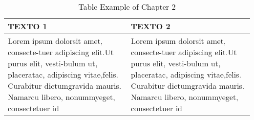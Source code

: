 %

\begin{table}[H]
    \begin{center}
        \begin{tabular}{|p{4cm}|p{4cm}|}
            \hline
            TEXTO 1  & TEXTO 2 \\
            \hline
            Lorem ipsum dolorsit amet, consecte-tuer adipiscing elit.Ut purus elit, vesti-bulum ut, placeratac, adipiscing vitae,felis. Curabitur dictumgravida mauris. Namarcu libero, nonummyeget, consectetuer id  & Lorem ipsum dolorsit amet, consecte-tuer adipiscing elit.Ut purus elit, vesti-bulum ut, placeratac, adipiscing vitae,felis. Curabitur dictumgravida mauris. Namarcu libero, nonummyeget, consectetuer id \\
            \hline
        \end{tabular}
    \caption{Table Example of Chapter 2}
    \label{C2T1:tableExample}
  \end{center}
\end{table}
